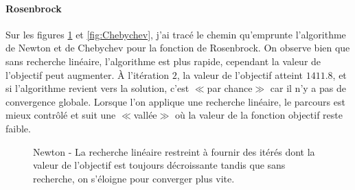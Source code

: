 \paragraph{Rosenbrock}

Sur les figures \ref{fig:Newton} et \ref{fig:Chebychev}, j'ai trac\'e le chemin qu'emprunte 
l'algorithme de Newton et de Chebychev pour la fonction de Rosenbrock.
On observe bien que sans recherche lin\'eaire, l'algorithme est plus rapide,
cependant la valeur de l'objectif peut augmenter. \`A l'it\'eration $2$, la valeur de l'objectif
 atteint $1411.8$, et si l'algorithme revient vers la solution, c'est {$\scriptscriptstyle\ll$}par chance{$\scriptscriptstyle\gg$} car il n'y a pas de convergence globale.
 Lorsque l'on applique une recherche lin\'eaire, le parcours est mieux contrôl\'e et suit une {$\scriptscriptstyle\ll$}vall\'ee{$\scriptscriptstyle\gg$} o\`u la valeur de la
fonction objectif reste faible.

\begin{figure}
\caption{Newton - La recherche lin\'eaire restreint \`a fournir des it\'er\'es dont la valeur de l'objectif est 
toujours d\'ecroissante tandis que sans recherche, on s'\'eloigne pour converger plus vite.}
\begin{center}
\end{center}
\label{fig:Newton}
\end{figure}

